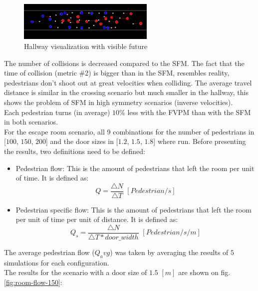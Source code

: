 \documentclass[english]{article}
\begin{document}
    \begin{figure}[H]
        \begin{centering}
        \includegraphics[width=6.5cm]{pics/program/hallway-future} 
        \par\end{centering}
        
        \caption{\label{fig:hallway-future}Hallway visualization with visible future}
    \end{figure}
    
    The number of collisions is decreased compared to the SFM. The fact
    that the time of collision (metric \#2) is bigger than in the SFM,
    resembles reality, pedestrians don't shoot out at great velocities
    when colliding. The average travel distance is similar in the crossing
    scenario but much smaller in the hallway, this shows the problem of
    SFM in high symmetry scenarios (inverse velocities). \\
     Each pedestrian turns (in average) $10\%$ less with the FVPM than
    with the SFM in both scenarios. \\

    For the escape room scenario, all 9 combinations for the number of pedestrians in [$100$, $150$, $200$] 
    and the door sizes in [$1.2$, $1.5$, $1.8$] where run.
    Before presenting the results, two definitions need to be defined:
    \begin{itemize}
        \item Pedestrian flow: This is the amount of pedestrians that left the room
        per unit of time. It is defined as: 
        \[
            Q=\frac{\triangle N}{\triangle T}\,\,[Pedestrian/s]
        \]
         
        \item Pedestrian specific flow: This is the amount of pedestrians that left
        the room per unit of time per unit of distance. It is defined as:
        \[
            Q_{s}=\frac{\triangle N}{\triangle T*door\_width}\,\,[Pedestrian/s/m]
        \]
    \end{itemize}

    
    The average pedestrian flow ($Q_avg$) was taken by averaging the results of $5$ simulations for each configuration.\\
    The results for the scenario with a door size of $1.5$ $[m]$ are shown on fig. \ref{fig:room-flow-150}:
\end{document}
